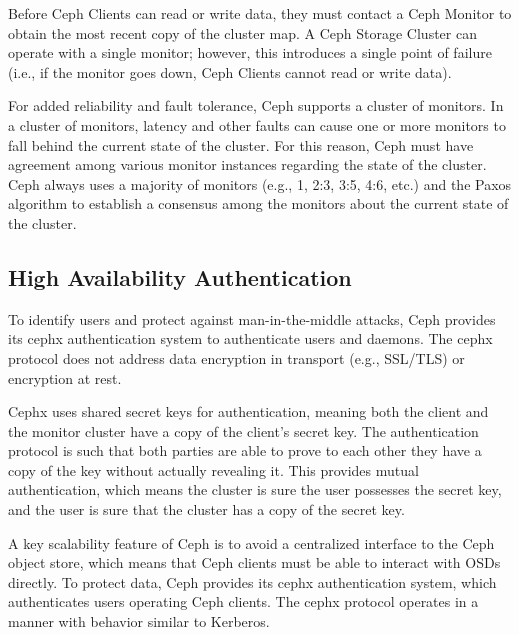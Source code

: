 \documentclass[12pt,a4paper]{report}
\begin{document}
Before Ceph Clients can read or write data, they must contact a Ceph Monitor to
obtain the most recent copy of the cluster map. A Ceph Storage Cluster can
operate with a single monitor; however, this introduces a single point of
failure (i.e., if the monitor goes down, Ceph Clients cannot read or write
data).

For added reliability and fault tolerance, Ceph supports a cluster of monitors.
In a cluster of monitors, latency and other faults can cause one or more
monitors to fall behind the current state of the cluster. For this reason, Ceph
must have agreement among various monitor instances regarding the state of the
cluster. Ceph always uses a majority of monitors (e.g., 1, 2:3, 3:5, 4:6, etc.)
and the Paxos algorithm to establish a consensus among the monitors about the
current state of the cluster.

\subsection{High Availability Authentication}
To identify users and protect against man-in-the-middle attacks, Ceph provides
its cephx authentication system to authenticate users and daemons.  The cephx
protocol does not address data encryption in transport (e.g., SSL/TLS) or
encryption at rest.

Cephx uses shared secret keys for authentication, meaning both the client and
the monitor cluster have a copy of the client’s secret key. The authentication
protocol is such that both parties are able to prove to each other they have a
copy of the key without actually revealing it. This provides mutual
authentication, which means the cluster is sure the user possesses the secret
key, and the user is sure that the cluster has a copy of the secret key.

A key scalability feature of Ceph is to avoid a centralized interface to the
Ceph object store, which means that Ceph clients must be able to interact with
OSDs directly. To protect data, Ceph provides its cephx authentication system,
which authenticates users operating Ceph clients. The cephx protocol operates
in a manner with behavior similar to Kerberos.
\end{document}
